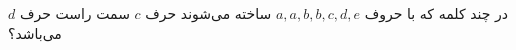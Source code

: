 \EXERCISE
در چند کلمه که با حروف 
$a, a, b, b, c, d, e$
ساخته می‌شوند حرف 
$c$
سمت راست حرف
$d$
می‌باشد؟